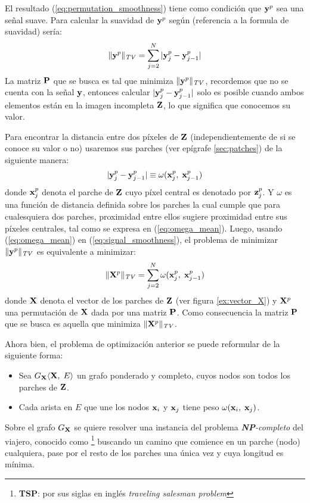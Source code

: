 El resultado (\ref{eq:permutation_smoothness}) tiene como condici\'on que $\y^p$ sea una señal suave. Para calcular la suavidad de $\y^p$ según (referencia a la formula de suavidad) ser\'ia:
\begin{equation}
	\|\y^p\|_{\mathit{TV}} = \sum_{j = 2}^{N}|\y_j^{p} - \y_{j - 1}^{p}|
	\label{eq:signal_smoothness}
\end{equation}
La matriz $\P$ que se busca es tal que minimiza $\|\y^p\|_{\mathit{TV}}$, recordemos que no se cuenta con la señal  $\y$, entonces calcular $|\y_j^{p} - \y_{j - 1}^{p}|$ solo es posible cuando ambos elementos est\'an en la imagen incompleta $\Z$, lo que significa que conocemos su valor.

Para encontrar la distancia entre dos p\'ixeles de $\Z$ (independientemente de si se conoce su valor o no) usaremos sus parches (ver epígrafe \ref{sec:patches}) de la siguiente manera:
\begin{equation}
	|\y_j^{p} - \y_{j - 1}^{p}| \equiv \omega(\x_j^p,\; \x_{j - 1}^p)
	\label{eq:omega_mean}
\end{equation}
donde $\x_j^p$ denota el parche de $\Z$ cuyo p\'ixel central es denotado por $\z_j^p$. Y $\omega$ es una funci\'on de distancia definida sobre los parches la cual cumple que para cualesquiera dos parches, proximidad entre ellos sugiere proximidad entre sus p\'ixeles centrales, tal como se expresa en (\ref{eq:omega_mean}). Luego, usando (\ref{eq:omega_mean}) en (\ref{eq:signal_smoothness}), el problema de minimizar $\|\y^p\|_{\mathit{TV}}$ es equivalente a minimizar:
\begin{equation}
	\|\X^p\|_{\mathit{TV}} = \sum_{j = 2}^{N}\omega(\x_j^{p},\; \x_{j - 1}^{p})
	\label{eq:path_smoothness}
\end{equation}
donde $\X$ denota el vector de los parches de $\Z$ (ver figura \ref{ex:vector_X}) y $\X^p$ una permutaci\'on de $\X$ dada por una matriz $\P$. Como consecuencia la matriz $\P$ que se busca es aquella  que minimiza $\|\X^p\|_{\mathit{TV}}$. 

Ahora bien, el problema de optimizaci\'on anterior se puede reformular de la siguiente forma:
\begin{itemize}
\item Sea $G_\X \langle\X,\;E\rangle$ un grafo ponderado y completo, cuyos nodos son todos los parches de $\Z$.
\item Cada arista en $E$ que une los nodos $\x_i$ y $\x_j$ tiene peso $\omega(\x_i,\; \x_j)$.
\end{itemize} 
Sobre el grafo $G_\X$ se quiere resolver una instancia del problema \textit{\textbf{NP}-completo} del viajero, conocido como \TSP\footnote{\textbf{TSP}: por sus siglas en ingl\'es \textit{traveling salesman problem}} \cite{cormen2009introduction,enwiki:tsp} buscando un camino que comience en un parche (nodo) cualquiera, pase por el resto de los parches una \'unica vez y cuya longitud es m\'inima.

